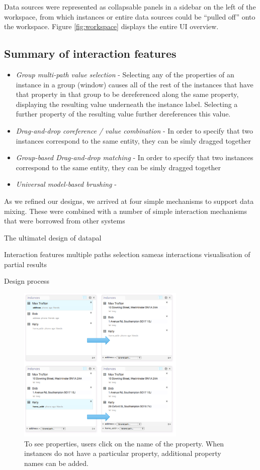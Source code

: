 \documentclass{sigchi}
\begin{document}
Data sources were represented as collapsable panels in a sidebar on the left of the workspace, from which instances or entire data sources could be ``pulled off'' onto the workspace.  Figure \ref{fig:workspace} displays the entire UI overview.

\subsection{Summary of interaction features}

\begin{itemize}
\item \emph{Group multi-path value selection} - Selecting any of the properties of an instance in a group (window) causes all of the rest of the instances that have that property in that group to be dereferenced along the same property, displaying the resulting value underneath the instance label.  Selecting a further property of the resulting value further dereferences this value.
\item \emph{Drag-and-drop coreference / value combination} - In order to specify that two instances correspond to the same entity, they can be simly dragged together
\item \emph{Group-based Drag-and-drop matching} - In order to specify that two instances correspond to the same entity, they can be simly dragged together
\item \emph{Universal model-based brushing} -
\end{itemize}


As we refined our designs, we arrived at four simple mechanisms to support data mixing.  These were combined with a number of simple interaction mechanisms that were borrowed from other systems

The ultimatel design of datapal

Interaction features 
	multiple paths selection
	sameas interactions
	visualisation of partial results

Design process

\begin{figure}[htbp]
\begin{center}
\includegraphics[width=8cm]{img/multipathing}
\caption{To see properties, users click on the name of the property. When instances do not have a particular property, additional property names can be added.}
\label{fig:multipathing}
\end{center}
\end{figure}
\end{document}

